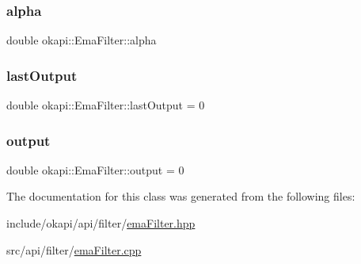 \subsubsection{\texorpdfstring{alpha}{alpha}}
{\footnotesize\ttfamily double okapi\+::\+Ema\+Filter\+::alpha\hspace{0.3cm}{\ttfamily [protected]}}

\mbox{\label{classokapi_1_1EmaFilter_a37c4fd3b6f355a49bc8b78790d3b3089}} 
\subsubsection{\texorpdfstring{lastOutput}{lastOutput}}
{\footnotesize\ttfamily double okapi\+::\+Ema\+Filter\+::last\+Output = 0\hspace{0.3cm}{\ttfamily [protected]}}

\mbox{\label{classokapi_1_1EmaFilter_a015a76278c1b89144ff5a3b6bf03d7b8}} 
\subsubsection{\texorpdfstring{output}{output}}
{\footnotesize\ttfamily double okapi\+::\+Ema\+Filter\+::output = 0\hspace{0.3cm}{\ttfamily [protected]}}



The documentation for this class was generated from the following files\+:\begin{DoxyCompactItemize}
\item 
include/okapi/api/filter/\mbox{\hyperlink{emaFilter_8hpp}{ema\+Filter.\+hpp}}\item 
src/api/filter/\mbox{\hyperlink{emaFilter_8cpp}{ema\+Filter.\+cpp}}\end{DoxyCompactItemize}
